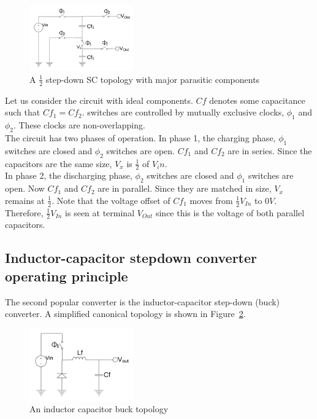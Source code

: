\documentclass[letterpaper,twocolumn,10pt]{article}
\begin{document}
\begin{figure}[here]
\includegraphics[width=0.4\textwidth]{SCTopology}
\caption{A $\frac{1}{2}$ step-down SC topology with major parasitic components}
\label{SCTopology}
\end{figure}

Let us consider the circuit with ideal components. $Cf$ denotes some capacitance such that $Cf_1 = Cf_2$. switches are controlled by mutually exclusive clocks, $\phi_1$ and $\phi_2$. These clocks are non-overlapping.\\
The circuit has two phases of operation. In phase 1, the charging phase, $\phi_1$ switches are closed and $\phi_2$ switches are open. $Cf_1$ and $Cf_2$ are in series. Since the capacitors are the same size, $V_x$ is $\frac{1}{2}$ of $V_in$.\\
In phase 2, the discharging phase, $\phi_2$ switches are closed and $\phi_1$ switches are open. Now $Cf_1$ and $Cf_2$ are in parallel. Since they are matched in size, $V_x$ remains at $\frac{1}{2}$. Note that the voltage offset of $Cf_1$ moves from $\frac{1}{2} V_{In}$ to $0V$. Therefore, $\frac{1}{2} V_{In}$ is seen at terminal $V_{Out}$ since this is the voltage of both parallel capacitors.\\

\subsection{Inductor-capacitor stepdown converter operating principle}

The second popular converter is the inductor-capacitor step-down (buck) converter. A simplified canonical topology is shown in Figure~\ref{BKTopology}.\\
\begin{figure}[here]
\includegraphics[width=0.4\textwidth]{BKTopology}
\caption{An inductor capacitor buck topology}
\label{BKTopology}
\end{figure}
\end{document}
